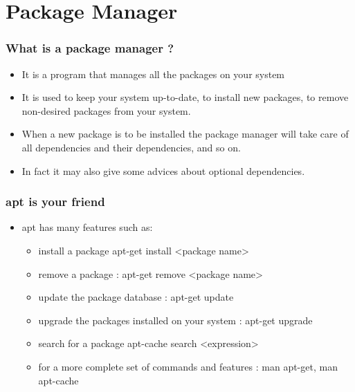\section{Package Manager}
\begin{frame}
    \frametitle{What is a package manager ?}
    \begin{itemize}
        \item<1 -> It is a program that manages all the packages on your system
        \item<2 -> It is used to keep your system up-to-date, to install new
        packages, to remove non-desired packages from your system.
        \item<3 -> When a new package is to be installed the package manager will
        take care of all dependencies and their dependencies, and so on.
        \item<4 -> In fact it may also give some advices about optional
        dependencies.
    \end{itemize}
\end{frame}
\begin{frame}
    \frametitle{apt is your friend}
    \begin{itemize}
        \item apt has many features such as:
        \begin{itemize}
            \item<1 -> install a package apt-get install <package name>
            \item<2 -> remove a package : apt-get remove <package name>
            \item<3 -> update the package database : apt-get update
            \item<4 -> upgrade the packages installed on your system : apt-get upgrade
            \item<5 -> search for a package apt-cache search <expression>
            \item<6 -> for a more complete set of commands and features : man
            apt-get, man apt-cache
        \end{itemize}
    \end{itemize}
\end{frame}
